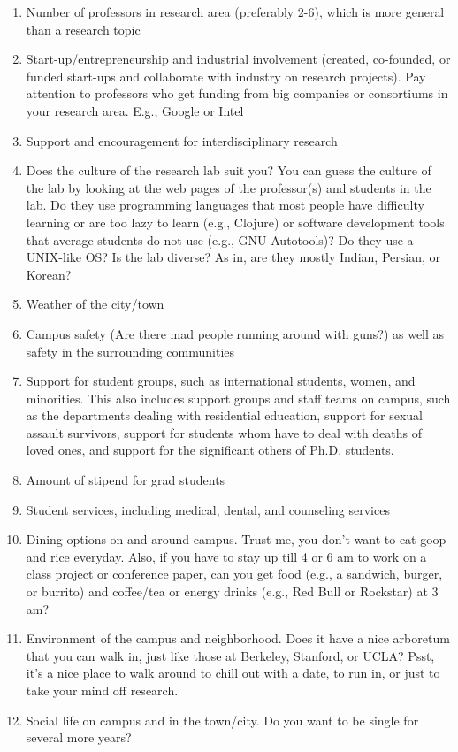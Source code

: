 \begin{enumerate}
\begin{enumerate}
	\item Number of professors in research area (preferably 2-6), which is more general than a research topic
	\item Start-up/entrepreneurship and industrial involvement (created, co-founded, or funded start-ups and collaborate with industry on research projects). Pay attention to professors who get funding from big companies or consortiums in your research area. E.g., Google or Intel
	\item Support and encouragement for interdisciplinary research
	\item Does the culture of the research lab suit you? You can guess the culture of the lab by looking at the web pages of the professor(s) and students in the lab. Do they use programming languages that most people have difficulty learning or are too lazy to learn (e.g., Clojure) or software development tools that average students do not use (e.g., GNU Autotools)? Do they use a UNIX-like OS? Is the lab diverse? As in, are they mostly Indian, Persian, or Korean?
	\item Weather of the city/town
	\item Campus safety (Are there mad people running around with guns?) as well as safety in the surrounding communities
	\item Support for student groups, such as international students, women, and minorities. This also includes support groups and staff teams on campus, such as the departments dealing with residential education, support for sexual assault survivors, support for students whom have to deal with deaths of loved ones, and support for the significant others of Ph.D. students.
	\item Amount of stipend for grad students
	\item Student services, including medical, dental, and counseling services
	\item Dining options on and around campus. Trust me, you don't want to eat goop and rice everyday. Also, if you have to stay up till 4 or 6 am to work on a class project or conference paper, can you get food (e.g., a sandwich, burger, or burrito) and coffee/tea or energy drinks (e.g., Red Bull or Rockstar) at 3 am?
	\item Environment of the campus and neighborhood. Does it have a nice arboretum that you can walk in, just like those at Berkeley, Stanford, or UCLA? Psst, it's a nice place to walk around to chill out with a date, to run in, or just to take your mind off research.
	\item Social life on campus and in the town/city. Do you want to be single for several more years?

\end{enumerate}
\end{enumerate}
